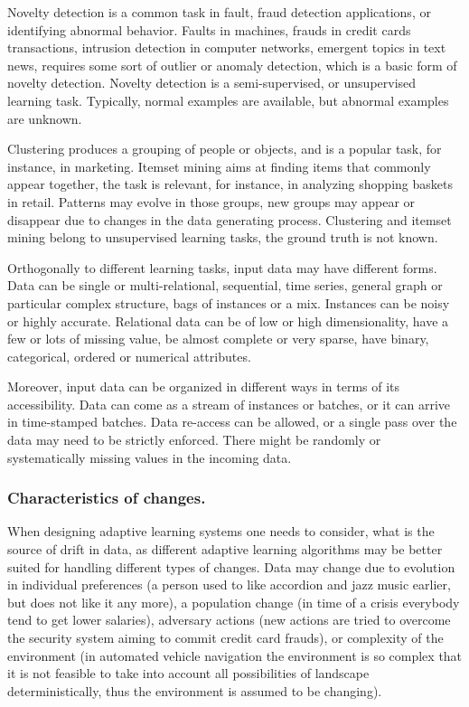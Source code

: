 \documentclass{llncs}
\begin{document}
Novelty detection is a common task in fault, fraud detection applications, or identifying abnormal behavior.
Faults in machines, frauds in credit cards transactions, intrusion detection in computer networks, emergent topics in text news, requires some sort of outlier or anomaly detection, which is a basic form of novelty detection.
Novelty detection is a semi-supervised, or unsupervised learning task.
Typically, normal examples are available, but abnormal examples are unknown.

Clustering produces a grouping of people or objects, and is a popular task, for instance, in marketing.
Itemset mining aims at finding items that commonly appear together, the task is relevant, for instance, in analyzing shopping baskets in retail.
Patterns may evolve in those groups, new groups may appear or disappear due to changes in the data generating process.
Clustering and itemset mining belong to unsupervised learning tasks, the ground truth is not known.

Orthogonally to different learning tasks, input data may have different forms.
Data can be single or multi-relational, sequential, time series, general graph or particular complex structure, bags of instances or a mix.
Instances can be noisy or highly accurate.
Relational data can be of low or high dimensionality, have a few or lots of missing value, be almost complete or very sparse, have binary, categorical, ordered or numerical attributes.

Moreover, input data can be organized in different ways in terms of its accessibility.
Data can come as a stream of instances or batches, or it can arrive in time-stamped batches.
Data re-access can be allowed, or a single pass over the data may need to be strictly enforced.
There might be randomly or systematically missing values in the incoming data.

\subsubsection{Characteristics of changes.}
When designing adaptive learning systems one needs to consider, what is the source of drift in data, as different adaptive learning algorithms may be better suited for handling different types of changes.
Data may change due to evolution in individual preferences (a person used to like accordion and jazz music earlier, but does not like it any more),
a population change (in time of a crisis everybody tend to get lower salaries),
adversary actions (new actions are tried to overcome the security system aiming to commit credit card frauds), or
complexity of the environment (in automated vehicle navigation the environment is so complex that
it is not feasible to take into account all possibilities of landscape deterministically, thus the environment is assumed to be changing).
\end{document}
